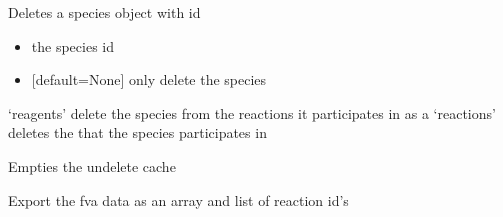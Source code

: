 \documentclass[letterpaper,10pt,english]{sphinxmanual}
\begin{document}
\begin{fulllineitems}
\begin{fulllineitems}
\begin{itemize}
\end{itemize}

\end{fulllineitems}


\begin{fulllineitems}
\label{\detokenize{modules_doc:cbmpy.CBModel.Model.deleteSpecies}}
\pysigstartsignatures
{}
\pysigstopsignatures
\sphinxAtStartPar
Deletes a species object with id
\begin{itemize}
\item {} 
\sphinxAtStartPar
{} the species id

\item {} 
\sphinxAtStartPar
{} {[}default=None{]} only delete the species

\end{itemize}

\sphinxAtStartPar
\textendash{} ‘reagents’ delete the species from the reactions it participates in as a 
\textendash{} ‘reactions’ deletes the  that the species participates in

\end{fulllineitems}


\begin{fulllineitems}
\label{\detokenize{modules_doc:cbmpy.CBModel.Model.emptyUndelete}}
\pysigstartsignatures
{}
\pysigstopsignatures
\sphinxAtStartPar
Empties the undelete cache

\end{fulllineitems}


\begin{fulllineitems}
\label{\detokenize{modules_doc:cbmpy.CBModel.Model.exportFVAdata}}
\pysigstartsignatures
{}
\pysigstopsignatures
\sphinxAtStartPar
Export the fva data as an array and list of reaction id’s


\end{fulllineitems}
\end{fulllineitems}
\end{document}
